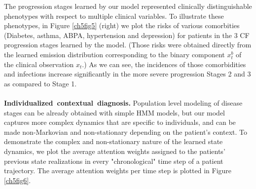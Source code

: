\documentclass [PhD] {uclathes}
\begin{document}
\begin{table}[t]
\centering {}
\caption{Performance of the different competing models for the 5 prognostic tasks.}
\label{ch5Table3}
\end{table}

The progression stages learned by our model represented clinically distinguishable phenotypes with respect to multiple clinical variables. To illustrate these phenotypes, in Figure \ref{ch5fig5} (right) we plot the risks of various comorbities (Diabetes, asthma, ABPA, hypertension and depression) for patients in the 3 CF progression stages learned by the model. (Those risks were obtained directly from the learned emission distribution corresponding to the binary component $x^b_t$ of the clinical observation $x_t$.) As we can see, the incidences of those comorbidities and infections increase significantly in the more severe progression Stages 2 and 3 as compared to Stage 1.\\
\\
{\bf Individualized~contextual~diagnosis.} Population level modeling of disease stages can be already obtained with simple HMM models, but our model captures more complex dynamics that are specific to individuals, and can be made non-Markovian and non-stationary depending on the patient's context. To demonstrate the complex and non-stationary nature of the learned state dynamics, we plot the average attention weights assigned to the patients' previous state realizations in every "chronological" time step of a patient trajectory. The average attention weights per time step is plotted in Figure \ref{ch5fig6}.
\end{document}
